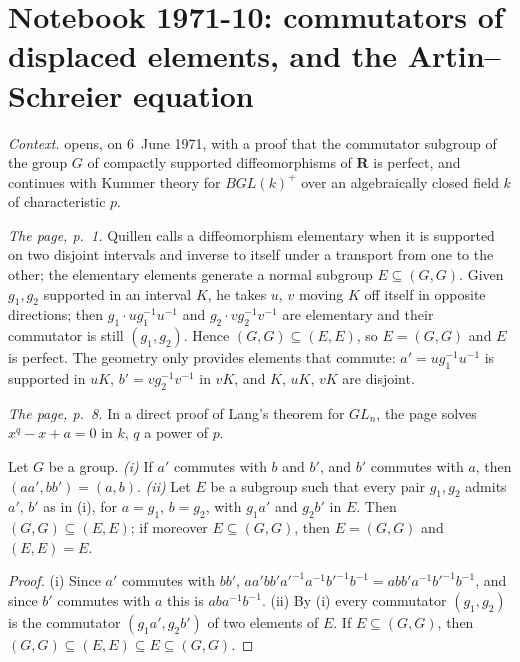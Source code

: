 \section[Notebook 1971-10: commutators of displaced elements; Artin--Schreier]{Notebook 1971-10: commutators of displaced elements, and the Artin--Schreier equation\protect{}}\label{sec:quillen-1971-10}

\emph{Context.}  opens, on 6~June 1971, with a proof that the commutator subgroup of the group $G$ of compactly supported diffeomorphisms of $\mathbf R$ is perfect, and continues with Kummer theory for $BGL(k)^+$ over an algebraically closed field $k$ of characteristic $p$.

\emph{The page, p.~1.} Quillen calls a diffeomorphism elementary when it is supported on two disjoint intervals and inverse to itself under a transport from one to the other; the elementary elements generate a normal subgroup $E \subseteq (G, G)$. Given $g_1, g_2$ supported in an interval $K$, he takes $u$, $v$ moving $K$ off itself in opposite directions; then $g_1 \cdot u g_1^{-1}u^{-1}$ and $g_2 \cdot v g_2^{-1} v^{-1}$ are elementary and their commutator is still $(g_1, g_2)$. Hence $(G,G) \subseteq (E,E)$, so $E = (G,G)$ and $E$ is perfect. The geometry only provides elements that commute: $a' = ug_1^{-1}u^{-1}$ is supported in $uK$, $b' = vg_2^{-1}v^{-1}$ in $vK$, and $K$, $uK$, $vK$ are disjoint.

\emph{The page, p.~8.} In a direct proof of Lang's theorem for $GL_n$, the page solves $x^q - x + a = 0$ in $k$, $q$ a power of $p$.

\begin{encadre}
\begin{theoreme}\label{thm:quillen-1971-10}
Let $G$ be a group. \emph{(i)} If $a'$ commutes with $b$ and $b'$, and $b'$ commutes with $a$, then $(aa', bb') = (a, b)$. \emph{(ii)} Let $E$ be a subgroup such that every pair $g_1, g_2$ admits $a'$, $b'$ as in (i), for $a = g_1$, $b = g_2$, with $g_1a'$ and $g_2b'$ in $E$. Then $(G, G) \subseteq (E, E)$; if moreover $E \subseteq (G, G)$, then $E = (G, G)$ and $(E, E) = E$.
\end{theoreme}
\end{encadre}

\begin{proof}
(i) Since $a'$ commutes with $bb'$, $aa'bb'a'^{-1}a^{-1}b'^{-1}b^{-1} = abb'a^{-1}b'^{-1}b^{-1}$, and since $b'$ commutes with $a$ this is $aba^{-1}b^{-1}$. (ii) By (i) every commutator $(g_1, g_2)$ is the commutator $(g_1a', g_2b')$ of two elements of $E$. If $E \subseteq (G,G)$, then $(G,G) \subseteq (E,E) \subseteq E \subseteq (G,G)$.
\end{proof}

